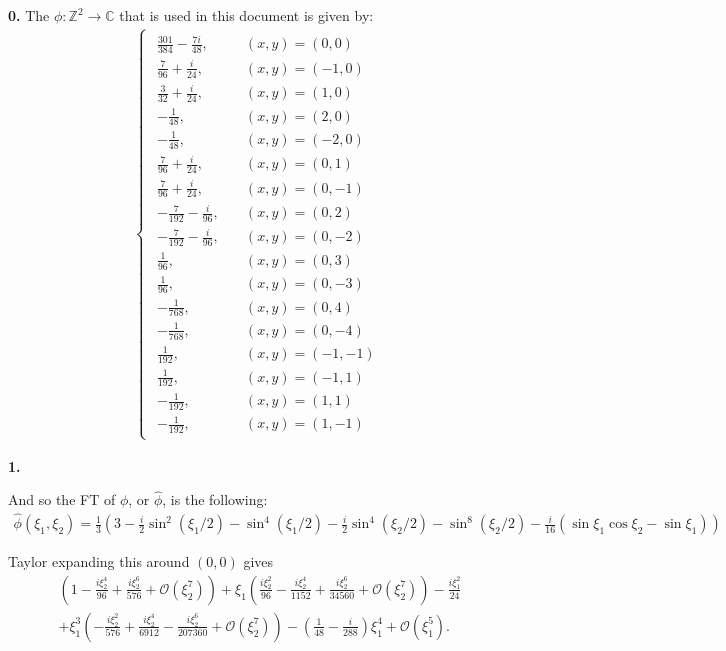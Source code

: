 \documentclass{article}
\theoremstyle{definition}
\newcommand{\nn}{\nonumber}
\newcommand{\f}[2]{\frac{#1}{#2}}
\newcommand{\lp}{\left(}
\newcommand{\rp}{\right)}
\begin{document}
\noindent \textbf{0.} The $\phi : \mathbb{Z}^2 \to \mathbb{C}$ that is used in this document is given by:
\begin{align}
\begin{cases}
\begin{alignedat}{2}
\f{301}{384} - \f{7i}{48}, &\quad (x,y) = (0,0)\\[10pt]
\f{7}{96} + \f{i}{24},& \quad (x,y) = (-1,0)\\[10pt]
\f{3}{32} + \f{i}{24},& \quad (x,y) = (1,0)\\[10pt]
-\f{1}{48}, &\quad (x,y) = (2,0)\\[10pt]
-\f{1}{48}, &\quad (x,y) = (-2,0)\\[10pt]
\f{7}{96} + \f{i}{24}, &\quad (x,y) = (0,1)\\[10pt]
\f{7}{96} + \f{i}{24}, &\quad (x,y) = (0,-1)\\[10pt]
-\f{7}{192} - \f{i}{96}, &\quad (x,y) = (0,2)\\[10pt]
-\f{7}{192} - \f{i}{96}, &\quad (x,y) = (0,-2)\\[10pt]
\f{1}{96}, &\quad (x,y) = (0,3)\\[10pt]
\f{1}{96}, &\quad (x,y) = (0,-3)\\[10pt]
-\f{1}{768}, &\quad (x,y) = (0,4)\\[10pt]
-\f{1}{768}, &\quad (x,y) = (0,-4)\\[10pt]
\f{1}{192}, &\quad (x,y) = (-1,-1)\\[10pt]
\f{1}{192}, &\quad (x,y) = (-1,1)\\[10pt]
-\f{1}{192}, &\quad (x,y) = (1,1)\\[10pt]
-\f{1}{192}, &\quad (x,y) = (1,-1)
\end{alignedat}
\end{cases}
\end{align}


\newpage



\noindent \textbf{1.}  


And so the FT of $\phi$, or $\hat\phi$, is the following: 
\begin{align}
\boxed{\hat{\phi}(\xi_1,\xi_2) =   \f{1}{3} \lp 3 - \f{i}{2}\sin^2(\xi_1/2) - \sin^4(\xi_1/2) - \f{i}{2}\sin^4(\xi_2/2) - \sin^8(\xi_2/2) - \f{i}{16}(\sin \xi_1 \cos \xi_2 - \sin \xi_1) \rp}
\end{align}

Taylor expanding this around $(0,0)$ gives 
\begin{align}
\left(1-\frac{i\xi_2^4}{96}+\frac{i\xi_2^6}{576}+ \mathcal{O}\left( \xi_2^7\right)\right) + \xi_1 \left(\frac{i  \xi_2^2}{96}-\frac{i  \xi_2^4}{1152}+\frac{i  \xi_2^6}{34560}+ \mathcal{O}\left( \xi_2^7 \right)\right)-\frac{i\xi_1^2}{24}\nn\\
+ \xi_1^3 \left(-\frac{i\xi_2^2}{576}+\frac{i\xi_2^4}{6912}-\frac{i\xi_2^6}{207360}+ \mathcal{O}\left( \xi_2^7\right)\right)-\left(\frac{1}{48}-\frac{i}{288}\right)  \xi_1^4+ \mathcal{O}\left( \xi_1^5\right).
\end{align}
\end{document}
